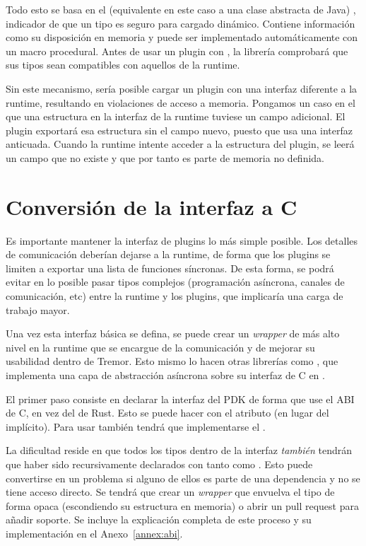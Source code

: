 Todo esto se basa en el \trait (equivalente en este caso a una clase abstracta
de Java) , indicador de que un tipo es seguro para cargado
dinámico. Contiene información como su disposición en memoria y puede ser
implementado automáticamente con un macro procedural. Antes de usar un plugin
con \abistable, la librería comprobará que sus tipos sean compatibles con
aquellos de la runtime.

Sin este mecanismo, sería posible cargar un plugin con una interfaz diferente a
la runtime, resultando en violaciones de acceso a memoria. Pongamos un caso en
el que una estructura en la interfaz de la runtime tuviese un campo adicional.
El plugin exportará esa estructura sin el campo nuevo, puesto que usa una
interfaz anticuada. Cuando la runtime intente acceder a la estructura del
plugin, se leerá un campo que no existe y que por tanto es parte de memoria no
definida.

\section{Conversión de la interfaz a C}

Es importante mantener la interfaz de plugins lo más simple posible. Los
detalles de comunicación deberían dejarse a la runtime, de forma que los plugins
se limiten a exportar una lista de funciones síncronas. De esta forma, se podrá
evitar en lo posible pasar tipos complejos (programación asíncrona, canales de
comunicación, etc) entre la runtime y los plugins, que implicaría una carga de
trabajo mayor.

Una vez esta interfaz básica se defina, se puede crear un \emph{wrapper} de más
alto nivel en la runtime que se encargue de la comunicación y de mejorar su
usabilidad dentro de Tremor. Esto mismo lo hacen otras librerías como
, que implementa una capa de abstracción asíncrona sobre su
interfaz de C en .

El primer paso consiste en declarar la interfaz del PDK de forma que use el ABI
de C, en vez del de Rust. Esto se puede hacer con el atributo \rust{#[repr(C)]}
(en lugar del  implícito). Para usar \abistable también
tendrá que implementarse el \trait {}.

La dificultad reside en que todos los tipos dentro de la interfaz \emph{también}
tendrán que haber sido recursivamente declarados con tanto \rust{#[repr(C)]}
como . Esto puede convertirse en un problema si alguno de ellos
es parte de una dependencia y no se tiene acceso directo. Se tendrá que crear un
\emph{wrapper} que envuelva el tipo de forma opaca (escondiendo su estructura en
memoria) o abrir un pull request para añadir soporte. Se incluye la explicación
completa de este proceso y su implementación en el Anexo~\ref{annex:abi}.

